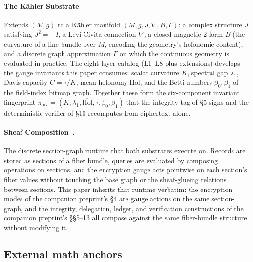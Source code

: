 \documentclass[11pt,letterpaper]{article}
\begin{document}
\paragraph{The K\"ahler Substrate~\cite{davis2026kahlersubstrate}.}
Extends $(M, g)$ to a K\"ahler manifold
$(M, g, J, \nabla, B, \Gamma)$: a complex structure $J$ satisfying
$J^2 = -I$, a Levi-Civita connection $\nabla$, a closed magnetic
2-form $B$ (the curvature of a line bundle over $M$, encoding
the geometry's holonomic content), and a discrete graph
approximation $\Gamma$ on which the continuous geometry is
evaluated in practice. The eight-layer catalog (L1--L8 plus
extensions) develops the gauge invariants this paper consumes:
scalar curvature $K$, spectral gap $\lambda_1$, Davis capacity
$C = \tau / K$, mean holonomy $\overline{\mathrm{Hol}}$, and the
Betti numbers $\beta_0, \beta_1$ of the field-index bitmap graph.
Together these form the six-component invariant fingerprint
$\pi_{\mathrm{inv}} = (K, \lambda_1, \overline{\mathrm{Hol}},
\tau, \beta_0, \beta_1)$ that the integrity tag of \S 5 signs
and the deterministic verifier of \S 10 recomputes from
ciphertext alone.

\paragraph{Sheaf Composition~\cite{davis2026sheafcomposition}.}
The discrete section-graph runtime that both substrates execute
on. Records are stored as sections of a fiber bundle, queries are
evaluated by composing operations on sections, and the encryption
gauge acts pointwise on each section's fiber values without
touching the base graph or the sheaf-glueing relations between
sections. This paper inherits that runtime verbatim: the
encryption modes of the companion preprint's \S 4 are gauge
actions on the same section-graph, and the integrity,
delegation, ledger, and verification constructions of the
companion preprint's \S\S 5--13 all compose against the same
fiber-bundle structure without modifying it.

\subsection{External math anchors}
\label{sec:background:anchors}
\end{document}
